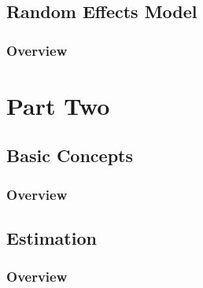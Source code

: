 \documentclass[11pt,fleqn]{book} %
\begin{document}
\chapter{Random Effects Model}

\section{Overview}




 \part{Part Two}



\chapter{Basic Concepts}

\section{Overview}




\chapter{Estimation}

\section{Overview}

\end{document}
